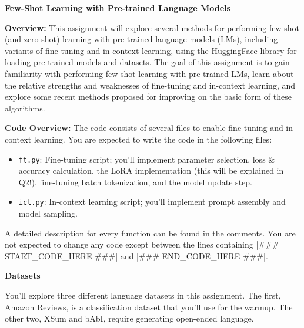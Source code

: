 \LARGE \textbf{Few-Shot Learning with Pre-trained Language Models}
\normalsize

\textbf{Overview:} This assignment will explore several methods for performing few-shot (and zero-shot) learning with pre-trained language models (LMs), including variants of fine-tuning and in-context learning, using the HuggingFace library for loading pre-trained models and datasets. The goal of this assignment is to gain familiarity with performing few-shot learning with pre-trained LMs, learn about the relative strengths and weaknesses of fine-tuning and in-context learning, and explore some recent methods proposed for improving on the basic form of these algorithms.

\textbf{Code Overview:} The code consists of several files to enable fine-tuning and in-context learning. You are expected to write the code in the following files:
\begin{itemize}
    \item \texttt{ft.py}: Fine-tuning script; you'll implement parameter selection, loss \& accuracy calculation, the LoRA implementation (this will be explained in Q2!), fine-tuning batch tokenization, and the model update step.
    \item \texttt{icl.py}: In-context learning script; you'll implement prompt assembly and model sampling.
\end{itemize}

A detailed description for every function can be found in the comments. You are not expected to change any code except between the lines containing |### START_CODE_HERE ###| and |### END_CODE_HERE ###|.

\textbf{Datasets}

You'll explore three different language datasets in this assignment. The first, Amazon Reviews, is a classification dataset that you'll use for the warmup. The other two, XSum and bAbI, require generating open-ended language.

